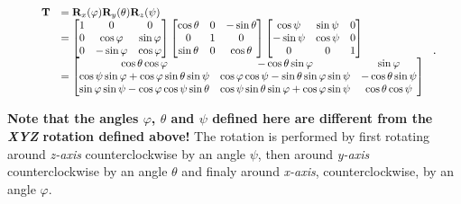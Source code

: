     \begin{equation}
        \scalebox{0.85}{
            $ \begin{array}{ll}
                \mathbf{T}
                &= \mathbf{R}_{x}(\varphi)\mathbf{R}_{y}(\theta)\mathbf{R}_{z}(\psi) \\
                &=
                \begin{bmatrix}
                    1 & 0 & 0 \\
                    0 & \cos \varphi & \sin \varphi \\
                    0 & -\sin \varphi & \cos \varphi
                \end{bmatrix}
                \begin{bmatrix}
                    \cos \theta & 0 & -\sin \theta \\
                    0 & 1 & 0 \\
                    \sin \theta & 0 & \cos \theta
                \end{bmatrix}
                \begin{bmatrix}
                    \cos \psi & \sin \psi & 0 \\
                    -\sin \psi & \cos \psi & 0 \\
                    0 & 0 & 1
                \end{bmatrix} \\
                &=
                \begin{bmatrix}
                    \cos \theta \cos \varphi
                    & - \cos \theta \sin \varphi
                    & \sin \varphi \\
                    \cos \psi \sin \varphi + \cos \varphi \sin \theta \sin \psi
                    & \cos \varphi \cos \psi - \sin \theta \sin \varphi \sin \psi
                    & -\cos \theta \sin \psi \\
                    \sin \varphi \sin \psi - \cos \varphi \cos \psi \sin \theta
                    & \cos \psi \sin \theta \sin \varphi + \cos \varphi \sin \psi
                    & \cos \theta \cos \psi
                \end{bmatrix}
            \end{array} $
        }
    .\end{equation}

    \textbf{Note that the angles $\varphi$, $\theta$ and $\psi$ defined here are
    different from the \textit{XYZ} rotation defined above!} The rotation
    is performed by first rotating around \textit{z-axis} counterclockwise
    by an angle $\psi$, then around \textit{y-axis} counterclockwise
    by an angle $\theta$ and finaly around \textit{x-axis}, counterclockwise,
    by an angle $\varphi$.

